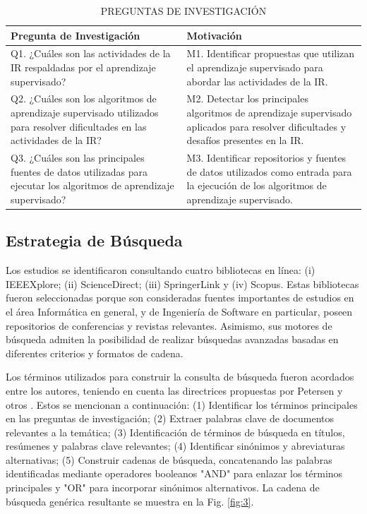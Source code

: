 \documentclass[journal]{IEEEtran}
\begin{document}
\begin{table}[!t]
\renewcommand{\arraystretch}{1.3}
\caption{PREGUNTAS DE INVESTIGACIÓN}
\label{tabla12}
\centering
\begin{tabular}{p{3cm}p{4.5cm}}
\hline
\hline
Pregunta de Investigación & Motivación \\
\hline
Q1. ¿Cuáles son las actividades de la IR respaldadas por el 
aprendizaje supervisado?  & M1. Identificar propuestas que 
utilizan el aprendizaje supervisado para abordar las 
actividades de la IR.\\ \cline{1-2}
Q2. ¿Cuáles son los algoritmos de aprendizaje supervisado utilizados para resolver dificultades en las actividades de la IR? & M2. Detectar los principales algoritmos de aprendizaje supervisado aplicados para resolver dificultades y desafíos presentes en la IR. \\ \cline{1-2}
Q3. ¿Cuáles son las principales fuentes de datos utilizadas para ejecutar los algoritmos de aprendizaje supervisado? & M3. Identificar repositorios y fuentes de datos utilizados como entrada para la ejecución de los algoritmos de aprendizaje supervisado. \\
\hline \hline                                                                                                    
\end{tabular}
\end{table}



\subsection{Estrategia de Búsqueda}

Los estudios se identificaron consultando cuatro bibliotecas en línea: (i) IEEEXplore; (ii) ScienceDirect; (iii) SpringerLink y (iv) Scopus. Estas bibliotecas fueron seleccionadas porque son consideradas fuentes importantes de estudios en el área Informática en general, y de Ingeniería de Software en particular, poseen repositorios de conferencias y revistas relevantes. Asimismo, sus motores de búsqueda admiten la posibilidad de realizar búsquedas avanzadas basadas en diferentes criterios y formatos de cadena.

Los términos utilizados para construir la consulta de búsqueda fueron acordados entre los autores, teniendo en cuenta las directrices propuestas por Petersen y otros \cite{petersen2008systematic}. Estos se mencionan a continuación: (1) Identificar los términos principales en las preguntas de investigación; (2) Extraer palabras clave de documentos relevantes a la temática; (3) Identificación de términos de búsqueda en títulos, resúmenes y palabras clave relevantes; (4) Identificar sinónimos y abreviaturas alternativas; (5) Construir cadenas de búsqueda, concatenando las palabras identificadas mediante operadores booleanos "AND" para enlazar los términos principales y "OR" para incorporar sinónimos alternativos. La cadena de búsqueda genérica resultante se muestra en la Fig. \ref{fig:3}.
\end{document}
